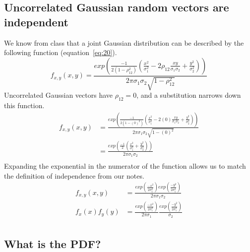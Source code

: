 \documentclass[12pt,letterpaper, onecolumn]{exam}
\begin{document}
\begin{questions}
\begin{parts}
		\part{Uncorrelated Gaussian random vectors are independent}
		\solution
		We know from class that a joint Gaussian distribution can be described by the following function (equation~\ref{eq:20}).
		\begin{equation}\label{eq:20}
			f_{x,y}(x,y) = \frac{exp\left(\frac{-1}{2(1 - \rho_{12}^2)}\left(\frac{x^2}{\sigma_1^2} - 2\rho_{12}\frac{xy}{\sigma_1\sigma_2}+\frac{y^2}{\sigma^2_2}\right) \right)}{2\pi\sigma_1\sigma_2\sqrt{1 - \rho_{12}^2}}
		\end{equation}
		Uncorrelated Gaussian vectors have $\rho_{12} = 0$, and a substitution narrows down this function.
		\begin{equation}
			\begin{split}
				f_{x,y}(x,y) & = \frac{exp\left(\frac{-1}{2(1 - (0)^2)}\left(\frac{x^2}{\sigma_1^2} - 2(0)\frac{xy}{\sigma_1\sigma_2}+\frac{y^2}{\sigma^2_2}\right) \right)}{2\pi\sigma_1\sigma_2\sqrt{1 - (0)^2}}\\
				& = \frac{exp\left(\frac{-1}{2}\left(\frac{x^2}{\sigma_1^2}+\frac{y^2}{\sigma^2_2}\right) \right)}{2\pi\sigma_1\sigma_2}\\
			\end{split}
		\end{equation}
		Expanding the exponential in the numerator of the function allows us to match the definition of independence from our notes.
		\begin{equation}
			\begin{split}
				f_{x,y}(x,y) & = \frac{exp\left(\frac{-x^2}{2\sigma_1^2}\right)exp\left(\frac{-y^2}{2\sigma_1^2}\right)}{2\pi\sigma_1\sigma_2}\\
				f_{x}(x)f_{y}(y) & = \frac{exp\left(\frac{-x^2}{2\sigma_1^2}\right)}{2\pi\sigma_1}\frac{exp\left(\frac{-y^2}{2\sigma_1^2}\right)}{\sigma_2}\\
			\end{split}
		\end{equation}
	\end{parts}
	\clearpage
	\begin{parts}
		\part{What is the PDF?}

\end{parts}
\end{questions}
\end{document}
